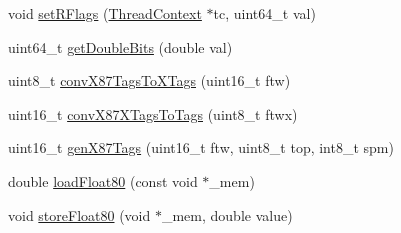 \begin{DoxyCompactItemize}
\item 
void \hyperlink{namespaceX86ISA_afcfb8527ec900004ecda24cd03b0b2a9}{setRFlags} (\hyperlink{classThreadContext}{ThreadContext} $\ast$tc, uint64\_\-t val)
\item 
uint64\_\-t \hyperlink{namespaceX86ISA_adaa2c2b77aafbc287d8624f8775f9fee}{getDoubleBits} (double val)
\item 
uint8\_\-t \hyperlink{namespaceX86ISA_add62d0d156403397cd87b43f80923727}{convX87TagsToXTags} (uint16\_\-t ftw)
\item 
uint16\_\-t \hyperlink{namespaceX86ISA_ae196a751ba59507ee189f66f87f62de1}{convX87XTagsToTags} (uint8\_\-t ftwx)
\item 
uint16\_\-t \hyperlink{namespaceX86ISA_ac18d679c6eeeda686a1e151dc944a5eb}{genX87Tags} (uint16\_\-t ftw, uint8\_\-t top, int8\_\-t spm)
\item 
double \hyperlink{namespaceX86ISA_a97c5f8f8ac0ded173ac00bfae8e92e0e}{loadFloat80} (const void $\ast$\_\-mem)
\item 
void \hyperlink{namespaceX86ISA_ae8b48156538261ce17898404db731128}{storeFloat80} (void $\ast$\_\-mem, double value)
\end{DoxyCompactItemize}
